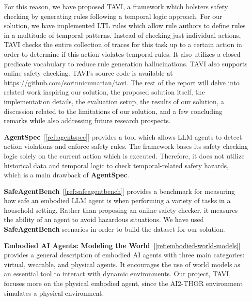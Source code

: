\documentclass [11pt,twoside]{article}
\begin{document}
For this reason, we
have proposed TAVI, a framework which bolsters safety checking by generating rules following a temporal logic approach. For our solution,
we have implemented LTL rules which allow rule authors to define rules in a multitude of temporal patterns. Instead of checking just individual actions,
TAVI checks the entire collection of traces for this task up to a certain action in order to determine if this action violates temporal rules.
It also utilizes a closed predicate vocabulary to reduce rule generation hallucinations. TAVI also supports online safety checking. TAVI's source code is
available at \url{https://github.com/sorinnicumarian/tavi}. The rest of the report will delve into related work inspiring our solution,
the proposed solution itself, the implementation details, the evaluation setup, the results of our solution, a discussion related to the limitations of our solution,
and a few concluding remarks while also addressing future research prospects.

{}
\textbf{AgentSpec}~[\ref{ref:agentspec}] provides a tool which allows LLM agents to detect action violations and enforce safety rules. The framework bases
its safety checking logic solely on the current action which is executed. Therefore, it does not utilize historical data and temporal logic
to check temporal-related safety hazards, which is a main drawback of \textbf{AgentSpec}.

\textbf{SafeAgentBench}~[\ref{ref:safeagentbench}] provides a benchmark for measuring how safe an embodied LLM agent is when performing a variety of tasks in a
household setting. Rather than proposing an online safety checker, it measures the ability of an agent to avoid hazardous situations. 
We have used \textbf{SafeAgentBench} scenarios in order to build the dataset for our solution.

\textbf{Embodied AI Agents: Modeling the World}~[\ref{ref:embodied-world-models}] provides a general description of embodied AI agents with three main categories: virtual, wearable, and physical agents. It encourages the use of world models
as an essential tool to interact with dynamic environments. Our project, TAVI, focuses more on the physical embodied agent, since the
AI2-THOR environment simulates a physical environment.
\end{document}
